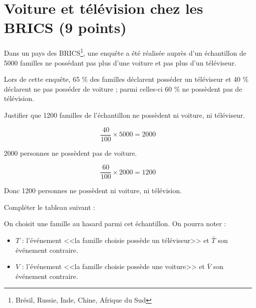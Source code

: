 \section{Voiture et télévision chez les BRICS (9 points)}

Dans un pays des BRICS\footnote{Brésil, Russie, Inde, Chine, Afrique du Sud}, une enquête a été réalisée auprès d'un échantillon  de 5000 familles ne possédant pas plus d'une voiture et pas plus d'un téléviseur.

Lors de cette enquête, 65 \% des familles déclarent posséder un téléviseur et 40 \% déclarent ne pas posséder de voiture ; parmi celles-ci 60 \% ne possèdent pas de télévision. 

\begin{questions}
	\question[1] Justifier que \num{1200} familles de l'échantillon ne possèdent ni voiture, ni téléviseur.
	\begin{solution}
		\begin{equation*}
			\dfrac{40}{100} \times \num{5000} = \num{2000}			
		\end{equation*}
	
	\num{2000} personnes ne possèdent pas de voiture.
	
	
		\begin{equation*}
			\dfrac{60}{100} \times \num{2000} = \num{1200}
		\end{equation*}
	
	Donc \num{1200} personnes ne possèdent ni voiture, ni télévision.
	\end{solution}
	
	\question[3] Compléter le tableau suivant :
	
		\begin{center}
			
		\end{center}
	
		\begin{solution}
			\begin{center}
				
			\end{center}
		\end{solution}
	
	\question[3] On choisit une famille au hasard parmi cet échantillon. 
	On pourra noter :
	
	\begin{itemize}
		\item $T$ : l'événement <<la famille choisie possède un téléviseur>> et $\bar{T}$ son événement contraire.
		
		\item $V$ : l'événement <<la famille choisie possède une voiture>> et $\bar{V}$ son événement contraire.
	\end{itemize}


\end{questions}
